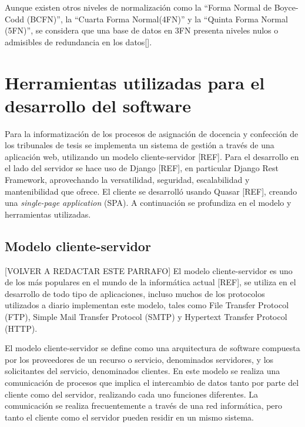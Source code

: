 Aunque existen otros niveles de normalización como la ``Forma Normal de Boyce-Codd (BCFN)'',
la ``Cuarta Forma Normal(4FN)'' y la ``Quinta Forma Normal (5FN)'',
se considera que una base de datos en 3FN presenta niveles nulos o 
admisibles de redundancia en los datos[\cite{ws_3FN}].










\section{Herramientas utilizadas para el desarrollo del software}
Para la informatización de los procesos
de asignación de docencia y confección de los tribunales de tesis
se implementa 
un sistema de gestión a través de una aplicación web,
utilizando un modelo cliente-servidor [REF].
Para el desarrollo en el lado del servidor se hace uso de Django [REF], en particular Django Rest Framework, aprovechando la
versatilidad, seguridad, escalabilidad y mantenibilidad
que ofrece.
El cliente se desarrolló usando Quasar [REF], creando una
\textit{single-page application} (SPA).
A continuación se profundiza en el modelo 
y herramientas utilizadas.

\subsection{Modelo cliente-servidor}
[VOLVER A REDACTAR ESTE PARRAFO]
El modelo cliente-servidor es uno de los más populares en
el mundo de la informática actual [REF], se utiliza en el 
desarrollo de todo tipo de aplicaciones, incluso muchos 
de los protocolos utilizados a diario implementan este modelo,
tales como File Transfer Protocol (FTP), Simple Mail Transfer Protocol
(SMTP) y Hypertext Transfer Protocol (HTTP).

El modelo cliente-servidor se define como una arquitectura
de software compuesta por los proveedores de un recurso o servicio, 
denominados servidores, y los solicitantes del servicio, denominados
clientes. En este modelo se realiza una comunicación de procesos
que implica el intercambio de datos tanto por parte del cliente 
como del servidor, realizando cada uno funciones diferentes. La comunicación
se realiza frecuentemente a través de una red informática, pero 
tanto el cliente como el servidor pueden residir en un mismo sistema.

